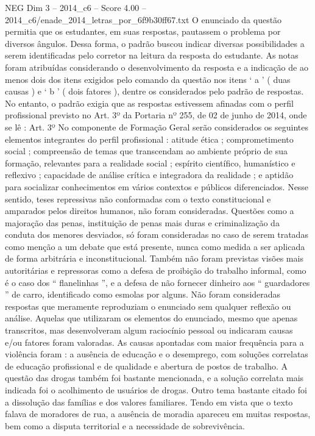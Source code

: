 \begin{textsample}{NEG Dim 3 – 2014\_c6 – Score 4.00 – 2014\_c6/enade\_2014\_letras\_por\_6f9b30ff67.txt}
O enunciado da questão permitia que os estudantes, em suas respostas, pautassem o problema por diversos ângulos.
Dessa forma, o padrão buscou indicar diversas possibilidades a serem identificadas pelo corretor na leitura da resposta do estudante.
As notas foram atribuídas considerando o desenvolvimento da resposta e a indicação de ao menos dois dos itens exigidos pelo comando da questão nos itens ‘ a ’ ( duas causas ) e ‘ b ’ ( dois fatores ), dentre os considerados pelo padrão de respostas.
No entanto, o padrão exigia que as respostas estivessem afinadas com o perfil profissional previsto no Art. 3º da Portaria nº 255, de 02 de junho de 2014, onde se lê : Art. 3º No componente de Formação Geral serão considerados os seguintes elementos integrantes do perfil profissional : atitude ética ; comprometimento social ; compreensão de temas que transcendam ao ambiente próprio de sua formação, relevantes para a realidade social ; espírito científico, humanístico e reflexivo ; capacidade de análise crítica e integradora da realidade ; e aptidão para socializar conhecimentos em vários contextos e públicos diferenciados.
Nesse sentido, teses repressivas não conformadas com o texto constitucional e amparados pelos direitos humanos, não foram consideradas.
Questões como a majoração das penas, instituição de penas mais duras e criminalização da conduta dos menores desviados, só foram consideradas no caso de serem tratadas como menção a um debate que está presente, nunca como medida a ser aplicada de forma arbitrária e inconstitucional.
Também não foram previstas visões mais autoritárias e repressoras como a defesa de proibição do trabalho informal, como é o caso dos “ flanelinhas ”, e a defesa de não fornecer dinheiro aos “ guardadores ” de carro, identificado como esmolas por alguns.
Não foram consideradas respostas que meramente reproduziam o enunciado sem qualquer reflexão ou análise.
Aquelas que utilizaram os elementos do enunciado, mesmo que apenas transcritos, mas desenvolveram algum raciocínio pessoal ou indicaram causas e/ou fatores foram valoradas.
As causas apontadas com maior frequência para a violência foram : a ausência de educação e o desemprego, com soluções correlatas de educação profissional e de qualidade e abertura de postos de trabalho.
A questão das drogas também foi bastante mencionada, e a solução correlata mais indicada foi o acolhimento de usuários de drogas.
Outro tema bastante citado foi a dissolução das famílias e dos valores familiares.
Tendo em vista que o texto falava de moradores de rua, a ausência de moradia apareceu em muitas respostas, bem como a disputa territorial e a necessidade de sobrevivência.

\end{textsample}
